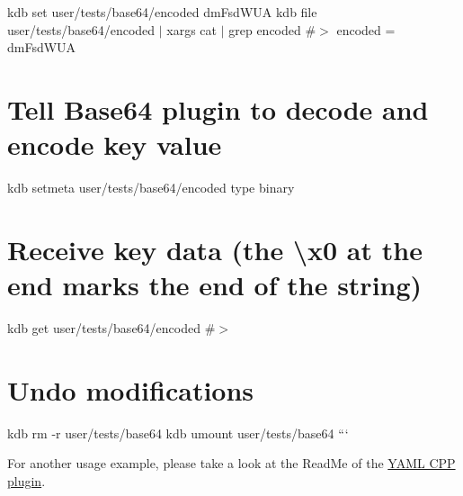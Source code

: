 kdb set user/tests/base64/encoded dm\+Fsd\+W\+UA kdb file user/tests/base64/encoded $\vert$ xargs cat $\vert$ grep encoded \#$>$ encoded = dm\+Fsd\+W\+UA

\section*{Tell Base64 plugin to decode and encode key value}

kdb setmeta user/tests/base64/encoded type binary

\section*{Receive key data (the {\ttfamily \textbackslash{}x0} at the end marks the end of the string)}

kdb get user/tests/base64/encoded \#$>$ 

\section*{Undo modifications}

kdb rm -\/r user/tests/base64 kdb umount user/tests/base64 ```

For another usage example, please take a look at the Read\+Me of the \hyperlink{md_src_plugins_yamlcpp_README_src_plugins_yamlcpp_README_md}{Y\+A\+ML C\+PP plugin}. 